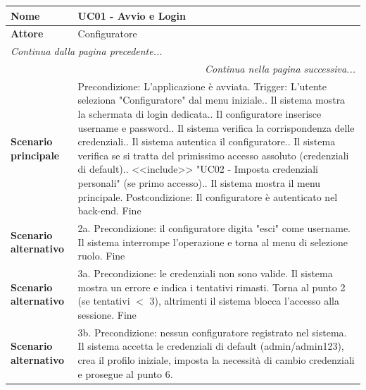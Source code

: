 \documentclass[12pt, a4paper, oneside]{report}
\begin{document}
\begin{tabularx}{\textwidth}{|l|X|}
    \hline
    \textbf{Nome}               & \textbf{UC01 - Avvio e Login} \\ \hline
    \textbf{Attore}             & Configuratore \\ \hline
    \endfirsthead 
    \hline
    \multicolumn{2}{|l|}{\textit{Continua dalla pagina precedente...}} \\ \hline
    \endhead 
    \hline
    \multicolumn{2}{|r|}{\textit{Continua nella pagina successiva...}} \\ \hline
    \endfoot 
    \hline
    \endlastfoot
    \textbf{Scenario principale} & 
    Precondizione: L'applicazione è avviata. \newline
    Trigger: L'utente seleziona "Configuratore" dal menu iniziale.\newline
    1. Il sistema mostra la schermata di login dedicata.\newline
    2. Il configuratore inserisce username e password.\newline
    3. Il sistema verifica la corrispondenza delle credenziali.\newline
    4. Il sistema autentica il configuratore.\newline
    5. Il sistema verifica se si tratta del primissimo accesso assoluto (credenziali di default).\newline
    6. <<include>> "UC02 - Imposta credenziali personali" (se primo accesso).\newline
    7. Il sistema mostra il menu principale.\newline
    Postcondizione: Il configuratore è autenticato nel back-end. \newline
    Fine \\ \hline
    \textbf{Scenario alternativo} & 
    2a. Precondizione: il configuratore digita "esci" come username.\newline
    Il sistema interrompe l'operazione e torna al menu di selezione ruolo. \newline
    Fine \\ \hline
    \textbf{Scenario alternativo} & 
    3a. Precondizione: le credenziali non sono valide. \newline
    Il sistema mostra un errore e indica i tentativi rimasti. Torna al punto 2 (se tentativi $<$ 3), altrimenti il sistema blocca l'accesso alla sessione. \newline
    Fine \\ \hline
    \textbf{Scenario alternativo} & 
    3b. Precondizione: nessun configuratore registrato nel sistema.\newline
    Il sistema accetta le credenziali di default (admin/admin123), crea il profilo iniziale, imposta la necessità di cambio credenziali e prosegue al punto 6. \\ \hline
\end{tabularx}
\end{document}

